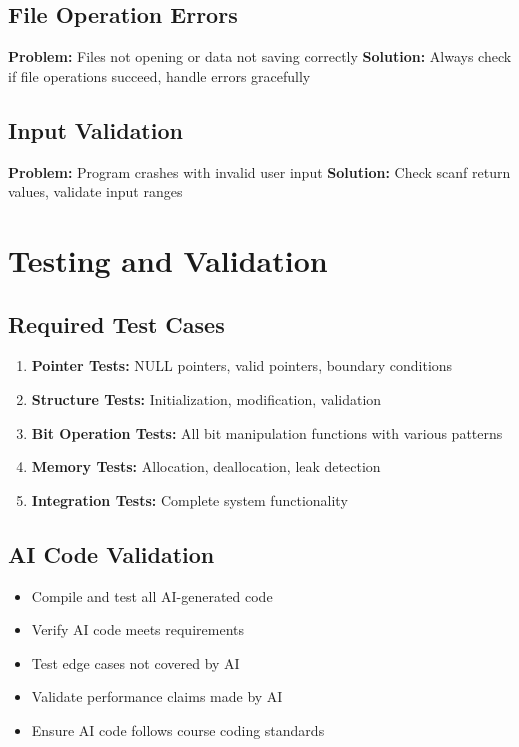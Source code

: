 \documentclass[11pt,a4paper]{article}
\begin{document}
\subsection{File Operation Errors}
\textbf{Problem:} Files not opening or data not saving correctly
\textbf{Solution:} Always check if file operations succeed, handle errors gracefully

\subsection{Input Validation}
\textbf{Problem:} Program crashes with invalid user input
\textbf{Solution:} Check scanf return values, validate input ranges

\section{Testing and Validation}

\subsection{Required Test Cases}
\begin{enumerate}
    \item \textbf{Pointer Tests:} NULL pointers, valid pointers, boundary conditions
    \item \textbf{Structure Tests:} Initialization, modification, validation
    \item \textbf{Bit Operation Tests:} All bit manipulation functions with various patterns
    \item \textbf{Memory Tests:} Allocation, deallocation, leak detection
    \item \textbf{Integration Tests:} Complete system functionality
\end{enumerate}

\subsection{AI Code Validation}
\begin{itemize}
    \item Compile and test all AI-generated code
    \item Verify AI code meets requirements
    \item Test edge cases not covered by AI
    \item Validate performance claims made by AI
    \item Ensure AI code follows course coding standards
\end{itemize}
\end{document}
